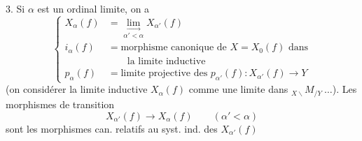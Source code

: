 3. Si $\alpha$ est un ordinal limite, on a
\[
\left\{\begin{aligned}
X_\alpha(f)&=\underset{\alpha'<\alpha}{\underset{\longrightarrow}{\lim}}X_{\alpha'}(f)\\
i_\alpha(f)&=\text{morphisme canonique de }X=X_0(f)\text{ dans}\\
&\qquad\text{la limite inductive}\\
p_\alpha(f)&=\text{limite projective des }p_{\alpha'}(f):X_{\alpha'}(f)\longrightarrow Y
\end{aligned}\right.
\]
(on  considérer la limite inductive  $X_\alpha(f)$ comme une limite dans ${}_{X\backslash}M_{/Y}\ \ldots$).
Les morphismes de transition
\[X_{\alpha'}(f)\longrightarrow X_\alpha(f)\qquad(\alpha'<\alpha)\]
sont les morphismes can. relatifs au syst. ind. des $X_{\alpha'}(f)$
